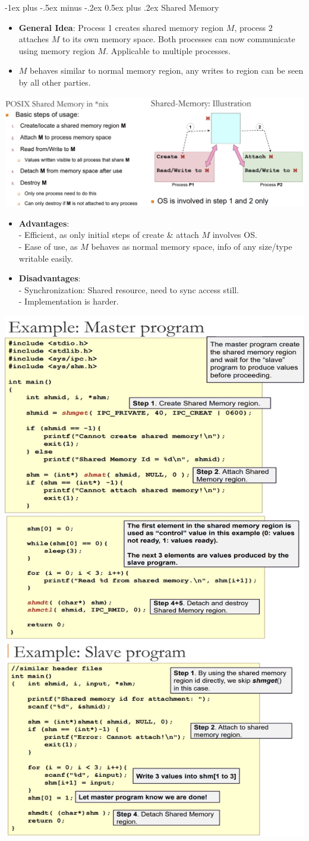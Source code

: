 \documentclass[10pt, landscape]{article}
\makeatletter
\renewcommand{\section}{\@startsection{section}{1}{0mm}%
                                {-1ex plus -.5ex minus -.2ex}%
                                {0.5ex plus .2ex}%
                                {\normalfont\large\bfseries}}
\makeatother
\begin{document}
\begin{multicols*}{3}
\section{Shared Memory}
\begin{itemize}
\item \textbf{General Idea}: Process 1 creates shared memory region $M$, process 2 attaches $M$ to its own memory space. Both processes can now communicate using memory region $M$. Applicable to multiple processes.
\item $M$ behaves similar to normal memory region, any writes to region can be seen by all other parties.
\end{itemize}
\centerline{\includegraphics[width=1\linewidth]{sharedMemory}}
\begin{itemize}
\item \textbf{Advantages}:  \\
- Efficient, as only initial steps of create \& attach $M$ involves OS. \\
- Ease of use, as $M$ behaves as normal memory space, info of any size/type writable easily.
\item \textbf{Disadvantages}: \\
- Synchronization: Shared resource, need to sync access still. \\
- Implementation is harder.
\end{itemize}
\centerline{\includegraphics[width=0.60\linewidth]{sharedMemoryExample}}



\end{multicols*}
\end{document}
